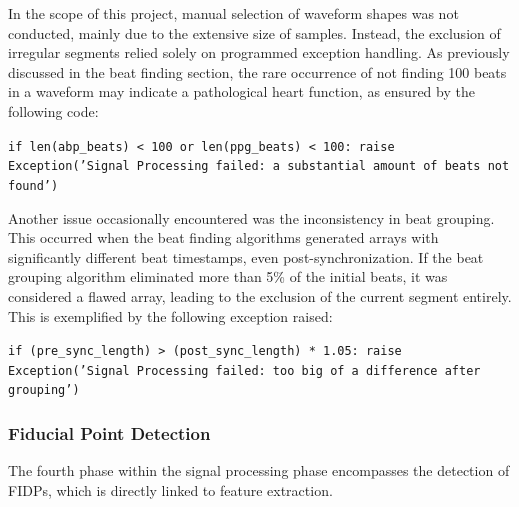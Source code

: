 In the scope of this project, manual selection of waveform shapes was not conducted, mainly due to the extensive size of samples.
Instead, the exclusion of irregular segments relied solely on programmed exception handling.
As previously discussed in the beat finding section, the rare occurrence of not finding 100 beats in a waveform may indicate a pathological heart function, as ensured by the following code:

\vspace{0.1cm}
{\texttt{\small if len(abp\_beats) < 100 or len(ppg\_beats) < 100: \newline
\indent\indent\indent raise Exception('Signal Processing failed: \newline
\indent\indent\indent\indent\indent\indent a substantial amount of beats not found')}}
\vspace{0.1cm}

Another issue occasionally encountered was the inconsistency in beat grouping.
This occurred when the beat finding algorithms generated arrays with significantly different beat timestamps, even post-synchronization.
If the beat grouping algorithm eliminated more than 5\% of the initial beats, it was considered a flawed array, leading to the exclusion of the current segment entirely.
This is exemplified by the following exception raised:

\vspace{0.1cm}
{\texttt{\small if (pre\_sync\_length) > (post\_sync\_length) * 1.05: \newline
\indent\indent\indent raise Exception('Signal Processing failed: \newline
\indent\indent\indent\indent\indent\indent too big of a difference after grouping')}}

\subsubsection{Fiducial Point Detection}
\label{subsubsec:fidp}

The fourth phase within the signal processing phase encompasses the detection of \ac{FIDPs}, which is directly linked to feature extraction.

